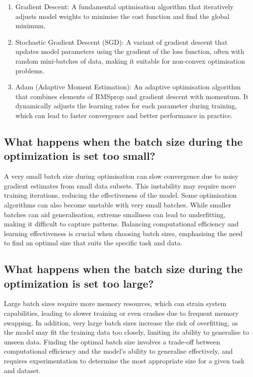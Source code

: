 \documentclass{article}
\begin{document}
\begin{enumerate}
    \item Gradient Descent: A fundamental optimisation algorithm that iteratively adjusts model weights to minimise the cost function and find the global minimum.
    \item Stochastic Gradient Descent (SGD): A variant of gradient descent that updates model parameters using the gradient of the loss function, often with random mini-batches of data, making it suitable for non-convex optimisation problems.
    \item Adam (Adaptive Moment Estimation): An adaptive optimisation algorithm that combines elements of RMSprop and gradient descent with momentum. It dynamically adjusts the learning rates for each parameter during training, which can lead to faster convergence and better performance in practice.
\end{enumerate}


\subsection{What happens when the batch size during the optimization is set too small?}

A very small batch size during optimisation can slow convergence due to noisy gradient estimates from small data subsets.
This instability may require more training iterations, reducing the effectiveness of the model.
Some optimisation algorithms can also become unstable with very small batches.
While smaller batches can aid generalisation, extreme smallness can lead to underfitting, making it difficult to capture patterns.
Balancing computational efficiency and learning effectiveness is crucial when choosing batch sizes, emphasising the need to find an optimal size that suits the specific task and data.


\subsection{What happens when the batch size during the optimization is set too large?}

Large batch sizes require more memory resources, which can strain system capabilities, leading to slower training or even crashes due to frequent memory swapping.
In addition, very large batch sizes increase the risk of overfitting, as the model may fit the training data too closely, limiting its ability to generalise to unseen data.
Finding the optimal batch size involves a trade-off between computational efficiency and the model's ability to generalise effectively, and requires experimentation to determine the most appropriate size for a given task and dataset.
\end{document}
